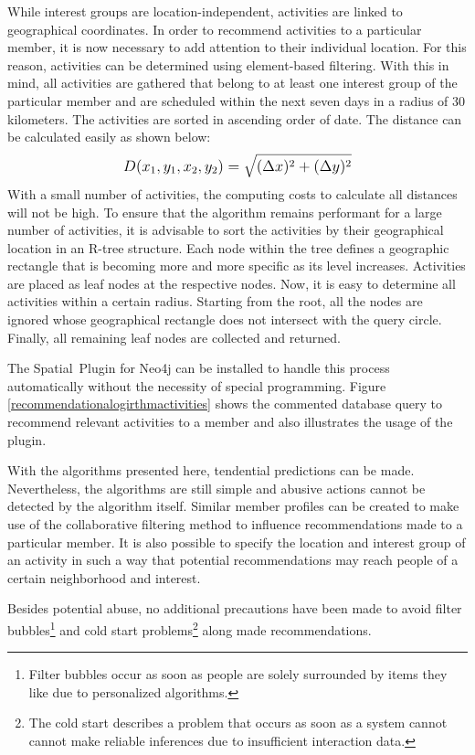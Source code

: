 \documentclass[12pt,numbers=noenddot,parskip,bibliography=totocnumbered,listof=totocnumbered,draft]{scrreprt}
\begin{document}
While interest groups are location-independent, activities are linked to geographical coordinates. In order to recommend activities to a particular member, it is now necessary to add attention to their individual location. For this reason, activities can be determined using element-based filtering. With this in mind, all activities are gathered that belong to at least one interest group of the particular member and are scheduled within the next seven days in a radius of 30 kilometers. The activities are sorted in ascending order of date. The distance can be calculated easily as shown below:
\[
\mathlarger{D(x_1, y_1, x_2, y_2) = \sqrt{(\Delta x)^2+(\Delta y)^2}}
\]
With a small number of activities, the computing costs to calculate all distances will not be high. To ensure that the algorithm remains performant for a large number of activities, it is advisable to sort the activities by their geographical location in an R-tree structure. Each node within the tree defines a geographic rectangle that is becoming more and more specific as its level increases. Activities are placed as leaf nodes at the respective nodes. Now, it is easy to determine all activities within a certain radius. Starting from the root, all the nodes are ignored whose geographical rectangle does not intersect with the query circle. Finally, all remaining leaf nodes are collected and returned.

The \mbox{Spatial Plugin} \citep{spatial} for \mbox{Neo4j} can be installed to handle this process automatically without the necessity of special programming. Figure \ref{recommendationalogirthmactivities} shows the commented database query to recommend relevant activities to a member and also illustrates the usage of the plugin. 

With the algorithms presented here, tendential predictions can be made. Nevertheless, the algorithms are still simple and abusive actions cannot be detected by the algorithm itself. Similar member profiles can be created to make use of the collaborative filtering method to influence recommendations made to a particular member. It is also possible to specify the location and interest group of an activity in such a way that potential recommendations may reach people of a certain neighborhood and interest.

Besides potential abuse, no additional precautions have been made to avoid filter bubbles\footnote{Filter bubbles occur as soon as people are solely surrounded by items they like due to personalized algorithms.} and cold start problems\footnote{The cold start describes a problem that occurs as soon as a system cannot cannot make reliable inferences due to insufficient interaction data.} along made recommendations.
\end{document}
